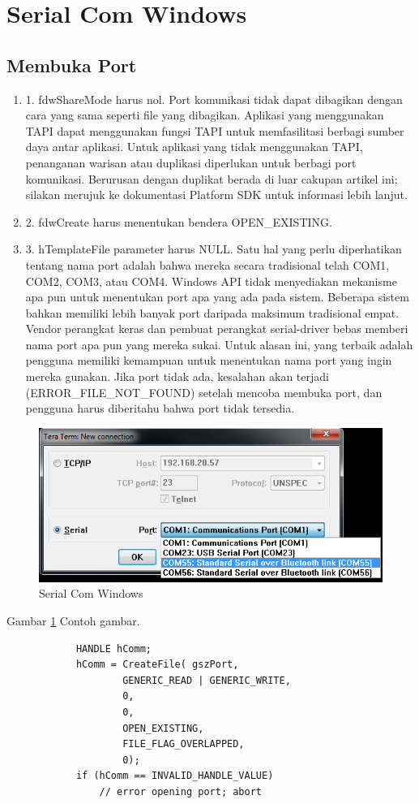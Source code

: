 \section{Serial Com Windows}
	\subsection{Membuka Port}
		\begin{enumerate} 
			Dokumentasi SDK Platform menyatakan bahwa ketika membuka port komunikasi, panggilan ke CreateFile memiliki persyaratan berikut:
				\item 1. fdwShareMode harus nol. Port komunikasi tidak dapat dibagikan dengan cara yang sama seperti file yang dibagikan. Aplikasi yang menggunakan TAPI dapat menggunakan fungsi TAPI untuk memfasilitasi berbagi sumber daya antar aplikasi. Untuk aplikasi yang tidak menggunakan TAPI, penanganan warisan atau duplikasi diperlukan untuk berbagi port komunikasi. Berurusan dengan duplikat berada di luar cakupan artikel ini; silakan merujuk ke dokumentasi Platform SDK untuk informasi lebih lanjut.
				\item 2. fdwCreate harus menentukan bendera OPEN_EXISTING.
				\item 3. hTemplateFile parameter harus NULL.
			Satu hal yang perlu diperhatikan tentang nama port adalah bahwa mereka secara tradisional telah COM1, COM2, COM3, atau COM4. Windows API tidak menyediakan mekanisme apa pun untuk menentukan port apa yang ada pada sistem. Beberapa sistem bahkan memiliki lebih banyak port daripada maksimum tradisional empat. Vendor perangkat keras dan pembuat perangkat serial-driver bebas memberi nama port apa pun yang mereka sukai. Untuk alasan ini, yang terbaik adalah pengguna memiliki kemampuan untuk menentukan nama port yang ingin mereka gunakan. Jika port tidak ada, kesalahan akan terjadi (ERROR_FILE_NOT_FOUND) setelah mencoba membuka port, dan pengguna harus diberitahu bahwa port tidak tersedia.
		\end{enumerate}
	\begin{figure}[ht]
		\centerline{\includegraphics[width=1\textwidth]{figures/seria.png}}
		\caption{Serial Com Windows}
		\label{seria}
	\end{figure}
	Gambar \ref{seria} Contoh gambar.
		\begin{verbatim}
			HANDLE hComm;
			hComm = CreateFile( gszPort,  
                    GENERIC_READ | GENERIC_WRITE, 
                    0, 
                    0, 
                    OPEN_EXISTING,
                    FILE_FLAG_OVERLAPPED,
                    0);
			if (hComm == INVALID_HANDLE_VALUE)
				// error opening port; abort
		\end{verbatim}
